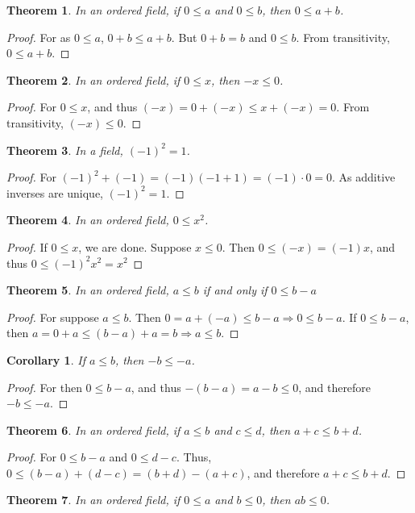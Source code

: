 \documentclass[crop=false,class=book]{standalone}
\theoremstyle{mystyle}
\newtheorem{theorem}{Theorem}[section]
\newtheorem{corollary}{Corollary}[section]
\begin{document}
\begin{theorem} In an ordered field, if $0\leq a$ and $0\leq b$, then $0\leq a+b$.
\end{theorem}
\begin{proof}
For as $0\leq a$, $0+b\leq a+b$. But $0+b = b$ and $0\leq b$. From transitivity, $0\leq a+b$.
\end{proof}
\begin{theorem}
In an ordered field, if $0\leq x$, then $-x\leq 0$.
\end{theorem}
\begin{proof}
For $0\leq x$, and thus $(-x)=0+(-x)\leq x+(-x) =0$. From transitivity, $(-x)\leq 0$.
\end{proof}
\begin{theorem}
In a field, $(-1)^2 = 1$.
\end{theorem}
\begin{proof}
For $(-1)^2 +(-1) = (-1)(-1+1) = (-1)\cdot 0 = 0$. As additive inverses are unique, $(-1)^2 = 1$.
\end{proof}
\begin{theorem}
In an ordered field, $0\leq x^2$.
\end{theorem}
\begin{proof}
If $0 \leq x$, we are done. Suppose $x\leq 0$. Then $0\leq (-x) = (-1)x$, and thus $0\leq (-1)^2 x^2=x^2$
\end{proof}
\begin{theorem}
In an ordered field, $a\leq b$ if and only if $0 \leq b-a$
\end{theorem}
\begin{proof}
For suppose $a\leq b$. Then $0=a+(-a)\leq b-a\Rightarrow 0 \leq b-a$. If $0\leq b-a$, then $a=0+a \leq (b-a)+a = b\Rightarrow a\leq b$.
\end{proof}
\begin{corollary}
If $a\leq b$, then $-b\leq -a$.
\end{corollary}
\begin{proof}
For then $0 \leq b-a$, and thus $-(b-a)=a-b\leq 0$, and therefore $-b \leq -a$.
\end{proof}
\begin{theorem}
In an ordered field, if $a\leq b$ and $c\leq d$, then $a+c \leq b+d$.
\end{theorem}
\begin{proof}
For $0\leq b-a$ and $0\leq d-c$. Thus, $0\leq (b-a)+(d-c)= (b+d)-(a+c)$, and therefore $a+c \leq b+d$.
\end{proof}
\begin{theorem}
In an ordered field, if $0\leq a$ and $b\leq 0$, then $ab\leq 0$.
\end{theorem}
\end{document}
